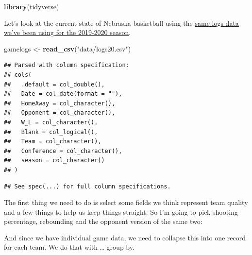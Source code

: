 \documentclass[
]{book}
\newenvironment{Shaded}{\begin{snugshade}}{\end{snugshade}}
\newcommand{\DataTypeTok}[1]{\textcolor[rgb]{0.13,0.29,0.53}{#1}}
\newcommand{\KeywordTok}[1]{\textcolor[rgb]{0.13,0.29,0.53}{\textbf{#1}}}
\newcommand{\NormalTok}[1]{#1}
\newcommand{\OperatorTok}[1]{\textcolor[rgb]{0.81,0.36,0.00}{\textbf{#1}}}
\newcommand{\StringTok}[1]{\textcolor[rgb]{0.31,0.60,0.02}{#1}}
\begin{document}
\begin{Shaded}
\begin{Highlighting}[]
\KeywordTok{library}\NormalTok{(tidyverse)}
\end{Highlighting}
\end{Shaded}

Let's look at the current state of Nebraska basketball using the \href{https://unl.box.com/s/yc01x7ae7r2jtuixo4j3s3s0ed7o5f8g}{same logs data we've been using for the 2019-2020 season}.

\begin{Shaded}
\begin{Highlighting}[]
\NormalTok{gamelogs <-}\StringTok{ }\KeywordTok{read_csv}\NormalTok{(}\StringTok{"data/logs20.csv"}\NormalTok{)}
\end{Highlighting}
\end{Shaded}

\begin{verbatim}
## Parsed with column specification:
## cols(
##   .default = col_double(),
##   Date = col_date(format = ""),
##   HomeAway = col_character(),
##   Opponent = col_character(),
##   W_L = col_character(),
##   Blank = col_logical(),
##   Team = col_character(),
##   Conference = col_character(),
##   season = col_character()
## )
\end{verbatim}

\begin{verbatim}
## See spec(...) for full column specifications.
\end{verbatim}

The first thing we need to do is select some fields we think represent team quality and a few things to help us keep things straight. So I'm going to pick shooting percentage, rebounding and the opponent version of the same two:

\begin{Shaded}
\end{Shaded}

And since we have individual game data, we need to collapse this into one record for each team. We do that with \ldots{} group by.

\begin{Shaded}
\end{Shaded}
\end{document}
